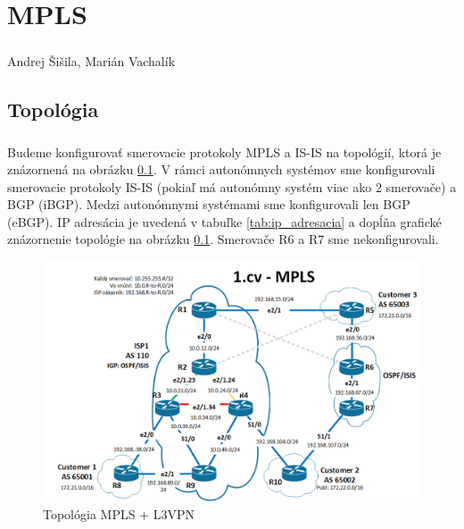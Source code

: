\documentclass[12pt,twoside,a4paper]{report}
\begin{document}

\setcounter{chapter}{1}
\chapter*{MPLS}
\paragraph{}
Andrej Šišila, Marián Vachalík

\tableofcontents

\newpage
\section{Topológia}
\paragraph{}
Budeme konfigurovať smerovacie protokoly MPLS a IS-IS na topológií, ktorá je znázornená na obrázku \ref{fig:mpls_isis_topo}. V rámci autonómnych systémov sme konfigurovali smerovacie protokoly IS-IS (pokiaľ má autonómny systém viac ako 2 smerovače) a BGP (iBGP). Medzi autonómnymi systémami sme konfigurovali len BGP (eBGP). IP adresácia je uvedená v tabuľke \ref{tab:ip_adresacia} a dopĺňa grafické znázornenie topológie na obrázku \ref{fig:mpls_isis_topo}. Smerovače R6 a R7 sme nekonfigurovali.

\begin{figure}[!htbp]
\centering
\includegraphics[width=14cm,keepaspectratio]{mpls_isis_topo}
\caption{Topológia MPLS + L3VPN}
\label{fig:mpls_isis_topo}
\end{figure}



\clearpage
\end{document}
